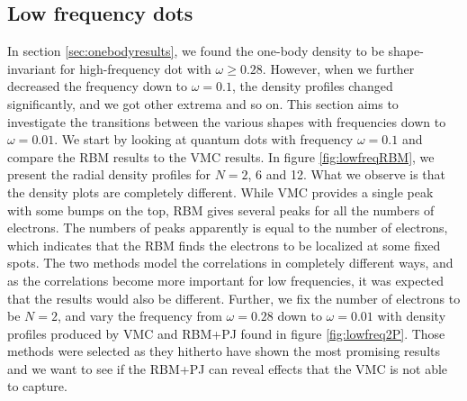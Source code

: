 \newpage
\subsection{Low frequency dots} \label{sec:lowfrequencies}
In section \ref{sec:onebodyresults}, we found the one-body density to be shape-invariant for high-frequency dot with $\omega\geq0.28$. However, when we further decreased the frequency down to $\omega=0.1$, the density profiles changed significantly, and we got other extrema and so on. This section aims to investigate the transitions between the various shapes with frequencies down to $\omega=0.01$. We start by looking at quantum dots with frequency $\omega=0.1$ and compare the RBM results to the VMC results. In figure \eqref{fig:lowfreqRBM}, we present the radial density profiles for $N=2$, 6 and 12. What we observe is that the density plots are completely different. While VMC provides a single peak with some bumps on the top, RBM gives several peaks for all the numbers of electrons. The numbers of peaks apparently is equal to the number of electrons, which indicates that the RBM finds the electrons to be localized at some fixed spots. The two methods model the correlations in completely different ways, and as the correlations become more important for low frequencies, it was expected that the results would also be different. Further, we fix the number of electrons to be $N=2$, and vary the frequency from $\omega=0.28$ down to $\omega=0.01$ with density profiles produced by VMC and RBM+PJ found in figure \eqref{fig:lowfreq2P}. Those methods were selected as they hitherto have shown the most promising results and we want to see if the RBM+PJ can reveal effects that the VMC is not able to capture.
